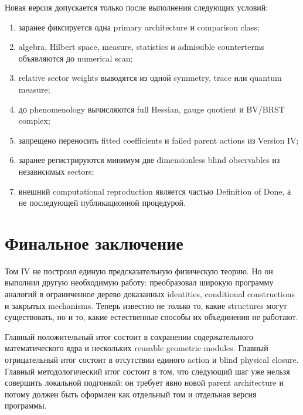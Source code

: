 \begin{protocol}
Новая версия допускается только после выполнения следующих условий:
\begin{enumerate}
 \item заранее фиксируется одна primary architecture и comparison class;
 \item algebra, Hilbert space, measure, statistics и admissible counterterms
 объявляются до numerical scan;
 \item relative sector weights выводятся из одной symmetry, trace или
 quantum measure;
 \item до phenomenology вычисляются full Hessian, gauge quotient и BV/BRST
 complex;
 \item запрещено переносить fitted coefficients и failed parent actions из
 Version IV;
 \item заранее регистрируются минимум две dimensionless blind observables из
 независимых sectors;
 \item внешний computational reproduction является частью Definition of
 Done, а не последующей публикационной процедурой.
\end{enumerate}
\end{protocol}

\section{Финальное заключение}

Том IV не построил единую предсказательную физическую теорию. Но он выполнил
другую необходимую работу: преобразовал широкую программу аналогий в
ограниченное дерево доказанных identities, conditional constructions и
закрытых mechanisms. Теперь известно не только то, какие structures могут
существовать, но и то, какие естественные способы их объединения не работают.

Главный положительный итог состоит в сохранении содержательного
математического ядра и нескольких reusable geometric modules. Главный
отрицательный итог состоит в отсутствии единого action и blind physical
closure. Главный методологический итог состоит в том, что следующий шаг уже
нельзя совершить локальной подгонкой: он требует явно новой parent
architecture и потому должен быть оформлен как отдельный том и отдельная
версия программы.